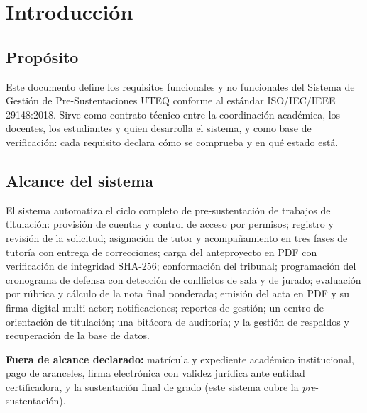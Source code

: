 \documentclass[11pt,a4paper]{article}
\begin{document}
\section{Introducción}

\subsection{Propósito}
Este documento define los requisitos funcionales y no funcionales del Sistema de Gestión de
Pre-Sustentaciones UTEQ conforme al estándar ISO/IEC/IEEE 29148:2018. Sirve como contrato
técnico entre la coordinación académica, los docentes, los estudiantes y quien desarrolla el
sistema, y como base de verificación: cada requisito declara cómo se comprueba y en qué
estado está.

\subsection{Alcance del sistema}
El sistema automatiza el ciclo completo de pre-sustentación de trabajos de titulación:
provisión de cuentas y control de acceso por permisos; registro y revisión de la solicitud;
asignación de tutor y acompañamiento en tres fases de tutoría con entrega de correcciones;
carga del anteproyecto en PDF con verificación de integridad SHA-256; conformación del
tribunal; programación del cronograma de defensa con detección de conflictos de sala y de
jurado; evaluación por rúbrica y cálculo de la nota final ponderada; emisión del acta en PDF
y su firma digital multi-actor; notificaciones; reportes de gestión; un centro de orientación
de titulación; una bitácora de auditoría; y la gestión de respaldos y recuperación de la base
de datos.

\textbf{Fuera de alcance declarado:} matrícula y expediente académico institucional, pago de
aranceles, firma electrónica con validez jurídica ante entidad certificadora, y la sustentación
final de grado (este sistema cubre la \emph{pre}-sustentación).
\end{document}
